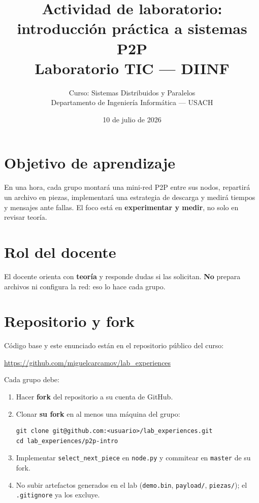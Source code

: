 \documentclass[12pt,a4paper]{article}
\title{Actividad de laboratorio: introducción práctica a sistemas P2P\\
\large Laboratorio TIC --- DIINF}
\author{Curso: Sistemas Distribuidos y Paralelos\\
Departamento de Ingeniería Informática --- USACH}
\date{10 de julio de 2026}
\begin{document}
\maketitle

\section{Objetivo de aprendizaje}

En una hora, cada grupo montará una mini-red P2P entre sus nodos, repartirá un archivo en piezas, implementará una estrategia de descarga y medirá tiempos y mensajes ante fallas. El foco está en \textbf{experimentar y medir}, no solo en revisar teoría.

\section{Rol del docente}

El docente orienta con \textbf{teoría} y responde dudas si las solicitan. \textbf{No} prepara archivos ni configura la red: eso lo hace cada grupo.

\section{Repositorio y fork}

Código base y este enunciado están en el repositorio público del curso:

\begin{center}
\url{https://github.com/miguelcarcamov/lab_experiences}
\end{center}

Cada grupo debe:

\begin{enumerate}
    \item Hacer \textbf{fork} del repositorio a su cuenta de GitHub.
    \item Clonar \textbf{su fork} en al menos una máquina del grupo:
    \begin{verbatim}
git clone git@github.com:<usuario>/lab_experiences.git
cd lab_experiences/p2p-intro
    \end{verbatim}
    \item Implementar \texttt{select\_next\_piece} en \texttt{node.py} y commitear en \texttt{master} de su fork.
    \item No subir artefactos generados en el lab (\texttt{demo.bin}, \texttt{payload/}, \texttt{piezas/}); el \texttt{.gitignore} ya los excluye.
\end{enumerate}
\end{document}
